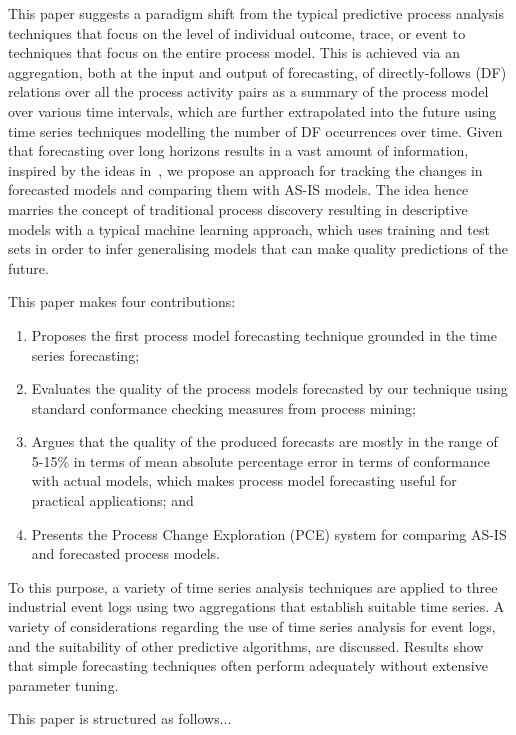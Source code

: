 This paper suggests a paradigm shift from the typical predictive process analysis techniques that focus on the level of individual outcome, trace, or event to techniques that focus on the entire process model.
This is achieved via an aggregation, both at the input and output of forecasting, of directly-follows (DF) relations over all the process activity pairs as a summary of the process model over various time intervals, which are further extrapolated into the future using time series techniques modelling the number of DF occurrences over time.
Given that forecasting over long horizons results in a vast amount of information, inspired by the ideas in~\cite{DBLP:conf/er/KabicherKR11}, we propose an approach for tracking the changes in forecasted models and comparing them with AS-IS models.
The idea hence marries the concept of traditional process discovery resulting in descriptive models with a typical machine learning approach, which uses training and test sets in order to infer generalising models that can make quality predictions of the future. 

This paper makes four contributions:
\begin{enumerate}
	\item Proposes the first process model forecasting technique grounded in the time series forecasting;
	\item Evaluates the quality of the process models forecasted by our technique using standard conformance checking measures from process mining;
	\item Argues that the quality of the produced forecasts are mostly in the range of 5-15\% in terms of mean absolute percentage error in terms of conformance with actual models, which makes process model forecasting useful for practical applications; and
	\item Presents the Process Change Exploration (PCE) system for comparing AS-IS and forecasted process models.
\end{enumerate}

To this purpose, a variety of time series analysis techniques are applied to three industrial event logs using two aggregations that establish suitable time series. 
A variety of considerations regarding the use of time series analysis for event logs, and the suitability of other predictive algorithms, are discussed.
Results show that simple forecasting techniques often perform adequately without extensive parameter tuning. 

This paper is structured as follows...